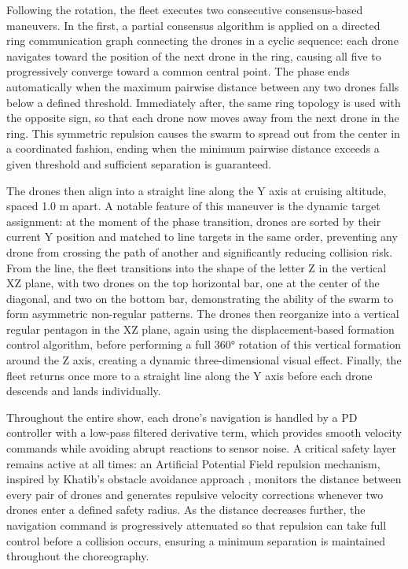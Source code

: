 Following the rotation, the fleet executes two consecutive consensus-based maneuvers. In the first, a partial consensus algorithm is applied on a directed ring communication graph connecting the drones in a cyclic sequence: each drone navigates toward the position of the next drone in the ring, causing all five to progressively converge toward a common central point. The phase ends automatically when the maximum pairwise distance between any two drones falls below a defined threshold. Immediately after, the same ring topology is used with the opposite sign, so that each drone now moves away from the next drone in the ring. This symmetric repulsion causes the swarm to spread out from the center in a coordinated fashion, ending when the minimum pairwise distance exceeds a given threshold and sufficient separation is guaranteed.

The drones then align into a straight line along the Y axis at cruising altitude, spaced 1.0 m apart. A notable feature of this maneuver is the dynamic target assignment: at the moment of the phase transition, drones are sorted by their current Y position and matched to line targets in the same order, preventing any drone from crossing the path of another and significantly reducing collision risk. From the line, the fleet transitions into the shape of the letter Z in the vertical XZ plane, with two drones on the top horizontal bar, one at the center of the diagonal, and two on the bottom bar, demonstrating the ability of the swarm to form asymmetric non-regular patterns. The drones then reorganize into a vertical regular pentagon in the XZ plane, again using the displacement-based formation control algorithm, before performing a full 360° rotation of this vertical formation around the Z axis, creating a dynamic three-dimensional visual effect. Finally, the fleet returns once more to a straight line along the Y axis before each drone descends and lands individually.

Throughout the entire show, each drone's navigation is handled by a PD controller with a low-pass filtered derivative term, which provides smooth velocity commands while avoiding abrupt reactions to sensor noise. A critical safety layer remains active at all times: an Artificial Potential Field repulsion mechanism, inspired by Khatib's obstacle avoidance approach \cite{khatib1986apf}, monitors the distance between every pair of drones and generates repulsive velocity corrections whenever two drones enter a defined safety radius. As the distance decreases further, the navigation command is progressively attenuated so that repulsion can take full control before a collision occurs, ensuring a minimum separation is maintained throughout the choreography.

